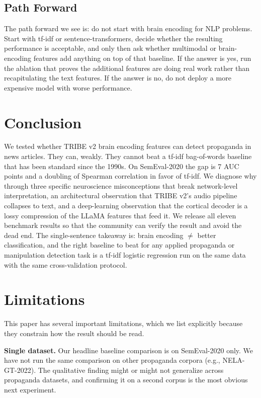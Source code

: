 \documentclass[11pt]{article}
\begin{document}
\subsection{Path Forward}

The path forward we see is: do not start with brain encoding for NLP problems. Start with tf-idf or sentence-transformers, decide whether the resulting performance is acceptable, and only then ask whether multimodal or brain-encoding features add anything on top of that baseline. If the answer is yes, run the ablation that proves the additional features are doing real work rather than recapitulating the text features. If the answer is no, do not deploy a more expensive model with worse performance.

\section{Conclusion}

We tested whether TRIBE v2 brain encoding features can detect propaganda in news articles. They can, weakly. They cannot beat a tf-idf bag-of-words baseline that has been standard since the 1990s. On SemEval-2020 the gap is 7 AUC points and a doubling of Spearman correlation in favor of tf-idf. We diagnose why through three specific neuroscience misconceptions that break network-level interpretation, an architectural observation that TRIBE v2's audio pipeline collapses to text, and a deep-learning observation that the cortical decoder is a lossy compression of the LLaMA features that feed it. We release all eleven benchmark results so that the community can verify the result and avoid the dead end. The single-sentence takeaway is: brain encoding $\neq$ better classification, and the right baseline to beat for any applied propaganda or manipulation detection task is a tf-idf logistic regression run on the same data with the same cross-validation protocol.

\section*{Limitations}

This paper has several important limitations, which we list explicitly because they constrain how the result should be read.

\textbf{Single dataset.} Our headline baseline comparison is on SemEval-2020 only. We have not run the same comparison on other propaganda corpora (e.g., NELA-GT-2022). The qualitative finding might or might not generalize across propaganda datasets, and confirming it on a second corpus is the most obvious next experiment.
\end{document}
